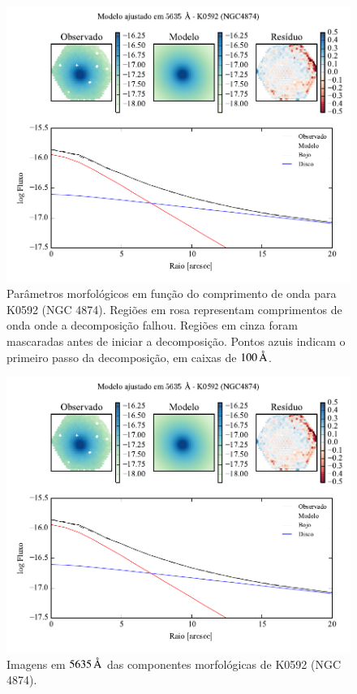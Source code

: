 \begin{figure}
	\includegraphics[page=2]{figuras-decomp/K0592_sample006a}
	\caption[Parâmetros morfológicos em função do comprimento de onda de K0592
	(NGC 4874)]
	{Parâmetros morfológicos em função do comprimento de onda para
	K0592 (NGC 4874). Regiões em rosa representam comprimentos de onda onde a
	decomposição falhou. Regiões em cinza foram mascaradas antes de iniciar a
	decomposição. Pontos azuis indicam o primeiro passo da decomposição, em caixas
	de $100\,\text{\normalfont\AA}$.}
	\label{fig:decompParams:K0592}
\end{figure}

\begin{figure}
	\includegraphics[page=3]{figuras-decomp/K0592_sample006a}
	\caption[Imagens em $5635\,\angstrom$ das componentes morfológicas de K0592
	(NGC 4874)]
	{Imagens em $5635\,\angstrom$ das componentes morfológicas de K0592
	(NGC 4874).}
	\label{fig:decompImages:K0592}
\end{figure}

